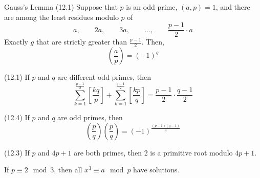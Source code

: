 \documentclass[12pt]{article}
\begin{document}
\begin{theorem}{Gauss's Lemma (12.1)}{}
    Suppose that $ p $ is an odd prime, $ \left( a, p \right) = 1 $, and there are among the least residues modulo $ p $ of
    \[ a, \qquad 2a, \qquad 3a, \qquad \dots, \qquad \frac{p - 1}{2} \cdot a \]
    Exactly $ g $ that are strictly greater than $ \frac{p - 1}{2} $. Then,
    \[ \left( \frac{a}{p} \right) = \left( -1 \right)^g \]
\end{theorem}
\begin{lemma}{(12.1)}{}
    If $ p $ and $ q $ are different odd primes, then
    \[ \sum_{k = 1}^\frac{p - 1}{2} \left[ \frac{kq}{p} \right] + \sum_{k = 1}^\frac{q - 1}{2} \left[ \frac{kp}{q} \right] = \frac{p - 1}{2} \cdot \frac{q - 1}{2} \]
\end{lemma}
\begin{theorem}{(12.4)}{}
    If $ p $ and $ q $ are odd primes, then
    \[ \left( \frac{p}{q} \right) \left( \frac{p}{q} \right) = \left( -1 \right)^{\frac{\left( p - 1 \right) \left( q - 1 \right)}{4}} \]
\end{theorem}
\begin{theorem}{(12.3)}{}
    If $ p $ and $ 4p + 1 $ are both primes, then 2 is a primitive root modulo $ 4p + 1 $.
\end{theorem}
\begin{theorem}{}{}
    If $ p \equiv 2 \mod 3 $, then all $ x^3 \equiv a \mod p $ have solutions.
\end{theorem}
\end{document}
